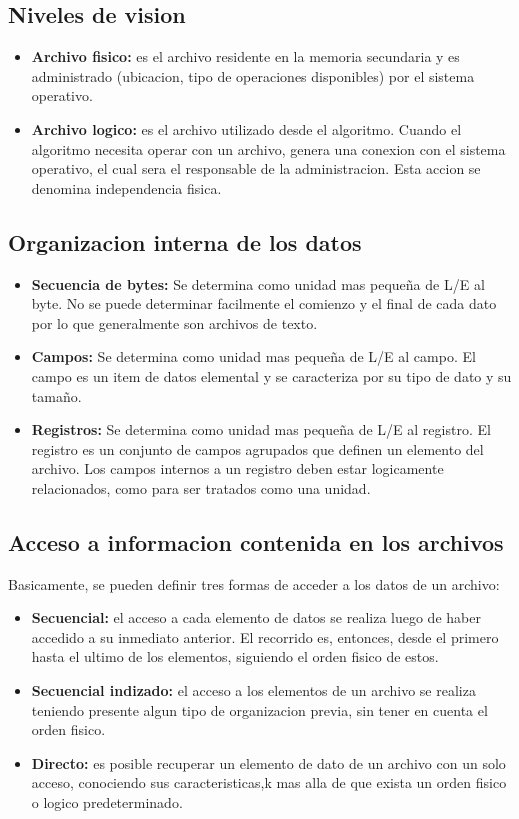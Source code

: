 \subsection{Niveles de vision}
\begin{itemize}
  \item \textbf{Archivo fisico: }es el archivo residente en la memoria secundaria y es administrado (ubicacion, tipo de operaciones disponibles) por el sistema operativo.
  \item \textbf{Archivo logico: }es el archivo utilizado desde el algoritmo. Cuando el algoritmo necesita operar con un archivo, genera una conexion con el sistema operativo, el cual sera el responsable de la administracion. Esta accion se denomina independencia fisica.
\end{itemize}


\subsection{Organizacion interna de los datos}

\begin{itemize}
    \item \textbf{Secuencia de bytes: }Se determina como unidad mas pequeña de L/E al byte. No se puede determinar facilmente el comienzo y el final de cada dato por lo que generalmente son archivos de texto.
    \item \textbf{Campos: }Se determina como unidad mas pequeña de L/E al campo. El campo es un item de datos elemental y se caracteriza por su tipo de dato y su tamaño.
    \item \textbf{Registros: }Se determina como unidad mas pequeña de L/E al registro. El registro es un conjunto de campos agrupados que definen un elemento del archivo. Los campos internos a un registro deben estar logicamente relacionados, como para ser tratados como una unidad.
\end{itemize}

\subsection{Acceso a informacion contenida en los archivos}
Basicamente, se pueden definir tres formas de acceder a los datos de un archivo:
\begin{itemize}
    \item \textbf{Secuencial: }el acceso a cada elemento de datos se realiza luego de haber accedido a su inmediato anterior. El recorrido es, entonces, desde el primero hasta el ultimo de los elementos, siguiendo el orden fisico de estos.
    \item \textbf{Secuencial indizado: }el acceso a los elementos de un archivo se realiza teniendo presente algun tipo de organizacion previa, sin tener en cuenta el orden fisico.
    \item \textbf{Directo: }es posible recuperar un elemento de dato de un archivo con un solo acceso, conociendo sus caracteristicas,k mas alla de que exista un orden fisico o logico predeterminado.
\end{itemize}

